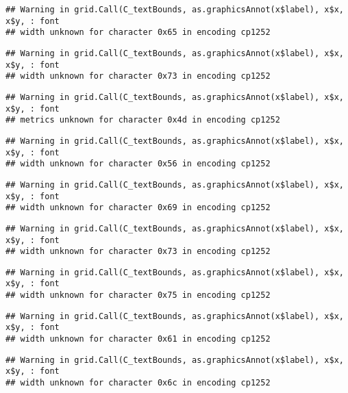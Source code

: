 \documentclass[
]{article}
\begin{document}
\begin{verbatim}
## Warning in grid.Call(C_textBounds, as.graphicsAnnot(x$label), x$x, x$y, : font
## width unknown for character 0x65 in encoding cp1252
\end{verbatim}

\begin{verbatim}
## Warning in grid.Call(C_textBounds, as.graphicsAnnot(x$label), x$x, x$y, : font
## width unknown for character 0x73 in encoding cp1252
\end{verbatim}

\begin{verbatim}
## Warning in grid.Call(C_textBounds, as.graphicsAnnot(x$label), x$x, x$y, : font
## metrics unknown for character 0x4d in encoding cp1252
\end{verbatim}

\begin{verbatim}
## Warning in grid.Call(C_textBounds, as.graphicsAnnot(x$label), x$x, x$y, : font
## width unknown for character 0x56 in encoding cp1252
\end{verbatim}

\begin{verbatim}
## Warning in grid.Call(C_textBounds, as.graphicsAnnot(x$label), x$x, x$y, : font
## width unknown for character 0x69 in encoding cp1252
\end{verbatim}

\begin{verbatim}
## Warning in grid.Call(C_textBounds, as.graphicsAnnot(x$label), x$x, x$y, : font
## width unknown for character 0x73 in encoding cp1252
\end{verbatim}

\begin{verbatim}
## Warning in grid.Call(C_textBounds, as.graphicsAnnot(x$label), x$x, x$y, : font
## width unknown for character 0x75 in encoding cp1252
\end{verbatim}

\begin{verbatim}
## Warning in grid.Call(C_textBounds, as.graphicsAnnot(x$label), x$x, x$y, : font
## width unknown for character 0x61 in encoding cp1252
\end{verbatim}

\begin{verbatim}
## Warning in grid.Call(C_textBounds, as.graphicsAnnot(x$label), x$x, x$y, : font
## width unknown for character 0x6c in encoding cp1252
\end{verbatim}
\end{document}
